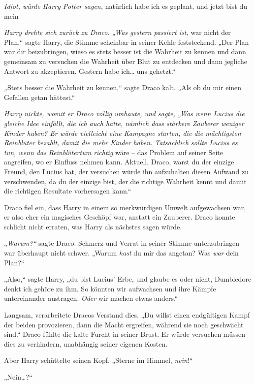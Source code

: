 {\emph{Idiot, würde Harry Potter sagen,} natürlich habe ich es geplant, und jetzt bist du mein\later

\emph{Harry drehte sich zurück zu Draco. „Was gestern passiert ist,} war nicht der Plan,“ sagte Harry, die Stimme scheinbar in seiner Kehle feststeckend. „Der Plan war dir beizubringen, wieso es stets besser ist die Wahrheit zu kennen und dann gemeinsam zu versuchen die Wahrheit über Blut zu entdecken und dann jegliche Antwort zu akzeptieren. Gestern habe ich… uns gehetzt.“

\emph{„}Stets besser die Wahrheit zu kennen,“ sagte Draco kalt. „Als ob du mir einen Gefallen getan hättest.“

\emph{Harry nickte, womit er Draco vollig umhaute, und sagte, „Was wenn Lucius die gleiche Idee einfällt, die ich auch hatte, nämlich dass stärkere Zauberer weniger Kinder haben? Er würde vielleicht eine Kampagne starten, die die mächtigsten Reinblüter bezahlt, damit die mehr Kinder haben. Tatsächlich sollte Lucius es tun, wenn das Reinblütertum richtig} wäre -- das Problem auf seiner Seite angreifen, wo er Einfluss nehmen kann. Aktuell, Draco, warst du der einzige Freund, den Lucius hat, der versuchen würde ihn aufzuhalten diesen Aufwand zu verschwenden, da du der einzige bist, der die richtige Wahrheit kennt und damit die richtigen Resultate vorhersagen kann.“

Draco fiel ein, dass Harry in einem so merkwürdigen Umwelt aufgewachsen war, er also eher ein magisches Geschöpf war, anstatt ein Zauberer. Draco konnte schlicht nicht erraten, was Harry als nächstes sagen würde.

„\emph{Warum?“} sagte Draco. Schmerz und Verrat in seiner Stimme unterzubringen war überhaupt nicht schwer. „Warum \emph{hast} du mir das angetan? Was \emph{war} dein Plan?“

„Also,“ sagte Harry, „du bist Lucius' Erbe, und glaube es oder nicht, Dumbledore denkt ich gehöre zu ihm. So könnten wir aufwachsen und ihre Kämpfe untereinander austragen. \emph{Oder} wir machen etwas anders.“

Langsam, verarbeitete Dracos Verstand dies. „Du willst einen endgültigen Kampf der beiden provozieren, dann die Macht ergreifen, während sie noch geschwächt sind.“ Draco fühlte die kalte Furcht in seiner Brust. Er würde versuchen müssen dies zu verhindern, unabhängig seiner eigenen Kosten.

Aber Harry schüttelte seinen Kopf. „Sterne im Himmel, \emph{nein}!“

„Nein…?“

}
